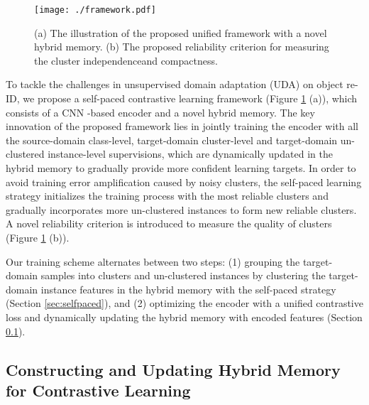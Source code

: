\documentclass{article}
\begin{document}
\begin{figure}[t]
\centering
\texttt{[image: ./framework.pdf]}
\caption{(a) The illustration of the proposed unified framework with a novel hybrid memory. 
(b) The proposed reliability criterion for measuring the cluster independence\protect\footnotemark[3] and compactness.}
\label{fig:fm}
\end{figure}


To tackle the challenges in unsupervised domain adaptation (UDA) on object re-ID, we propose a self-paced contrastive learning framework (Figure \ref{fig:fm} (a)), which consists of a CNN \cite{lecun1989backpropagation}-based encoder  and a novel hybrid memory. The key innovation of the proposed framework lies in jointly training the encoder with all the source-domain class-level, target-domain cluster-level and target-domain un-clustered instance-level supervisions, which are dynamically updated in the hybrid memory to gradually provide more confident learning targets. In order to avoid training error amplification caused by noisy clusters, the self-paced learning strategy initializes the training process with the most reliable clusters and gradually incorporates more un-clustered instances to form new reliable clusters. A novel reliability criterion is introduced to measure the quality of clusters (Figure \ref{fig:fm} (b)).

Our training scheme alternates between two steps: 
(1) grouping the target-domain samples into clusters and un-clustered instances by clustering the target-domain instance features in the hybrid memory with the self-paced strategy (Section \ref{sec:selfpaced}), and
(2) optimizing the encoder  with a unified contrastive loss and dynamically updating the hybrid memory with encoded features (Section \ref{sec:contrastive}).




\subsection{Constructing and Updating Hybrid Memory for Contrastive Learning}
\label{sec:contrastive}
\vspace{-5pt}
\end{document}
